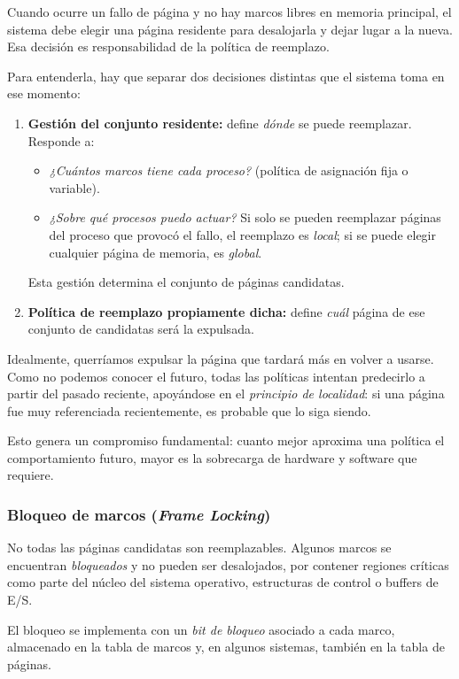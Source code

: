 Cuando ocurre un fallo de página y no hay marcos libres en memoria principal, el sistema debe elegir una página residente para desalojarla y dejar lugar a la nueva. Esa decisión es responsabilidad de la política de reemplazo.

Para entenderla, hay que separar dos decisiones distintas que el sistema toma en ese momento:
\begin{enumerate}
  \item \textbf{Gestión del conjunto residente:} define \textit{dónde} se puede reemplazar. Responde a:
  \begin{itemize}
    \item \textit{¿Cuántos marcos tiene cada proceso?} (política de asignación fija o variable).
    \item \textit{¿Sobre qué procesos puedo actuar?} Si solo se pueden reemplazar páginas del proceso que provocó el fallo, el reemplazo es \textit{local}; si se puede elegir cualquier página de memoria, es \textit{global}.
  \end{itemize}
  Esta gestión determina el conjunto de páginas candidatas.

  \item \textbf{Política de reemplazo propiamente dicha:} define \textit{cuál} página de ese conjunto de candidatas será la expulsada.
\end{enumerate}

Idealmente, querríamos expulsar la página que tardará más en volver a usarse. Como no podemos conocer el futuro, todas las políticas intentan predecirlo a partir del pasado reciente, apoyándose en el \textit{principio de localidad}: si una página fue muy referenciada recientemente, es probable que lo siga siendo.

Esto genera un compromiso fundamental: cuanto mejor aproxima una política el comportamiento futuro, mayor es la sobrecarga de hardware y software que requiere.

\subsubsection{Bloqueo de marcos (\textit{Frame Locking})}

No todas las páginas candidatas son reemplazables. Algunos marcos se encuentran \textit{bloqueados} y no pueden ser desalojados, por contener regiones críticas como parte del núcleo del sistema operativo, estructuras de control o buffers de E/S.

El bloqueo se implementa con un \textit{bit de bloqueo} asociado a cada marco, almacenado en la tabla de marcos y, en algunos sistemas, también en la tabla de páginas.

